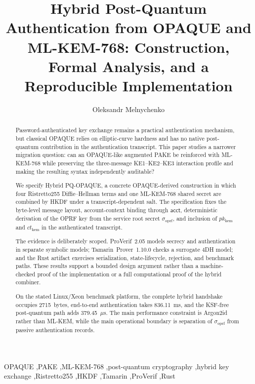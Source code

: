 \documentclass[preprint,12pt]{elsarticle}
\newcommand{\acct}{\mathsf{acct}}
\newcommand{\sigoprf}{\sigma_{\mathrm{oprf}}}
\theoremstyle{remark}
\begin{document}

\begin{frontmatter}

\title{Hybrid Post-Quantum Authentication from OPAQUE and ML-KEM-768: Construction, Formal Analysis, and a Reproducible Implementation}

\author{Oleksandr Melnychenko}

\address{Khmelnytskyi National University, Khmelnytskyi, Ukraine}


\begin{abstract}
Password-authenticated key exchange remains a practical authentication
mechanism, but classical OPAQUE relies on elliptic-curve hardness and has
no native post-quantum contribution in the authentication transcript. This
paper studies a narrower migration question: can an OPAQUE-like augmented
PAKE be reinforced with ML-KEM-768 while preserving the three-message
KE1--KE2--KE3 interaction profile and making the resulting syntax
independently auditable?

We specify Hybrid PQ-OPAQUE, a concrete OPAQUE-derived construction in
which four Ristretto255 Diffie--Hellman terms and one ML-KEM-768 shared
secret are combined by HKDF under a transcript-dependent salt. The
specification fixes the byte-level message layout, account-context binding
through $\acct$, deterministic derivation of the OPRF key from the service
root secret $\sigoprf$, and inclusion of $pk_{\mathrm{kem}}$ and
$ct_{\mathrm{kem}}$ in the authenticated transcript.

The evidence is deliberately scoped. ProVerif~2.05 models secrecy and
authentication in separate symbolic models; Tamarin~Prover~1.10.0 checks a
surrogate 4DH model; and the Rust artifact exercises serialization,
state-lifecycle, rejection, and benchmark paths. These results support a
bounded design argument rather than a machine-checked proof of the
implementation or a full computational proof of the hybrid combiner.

On the stated Linux/Xeon benchmark platform, the complete hybrid handshake
occupies 2715~bytes, end-to-end authentication takes 836.11~ms, and the
KSF-free post-quantum path adds 379.45~$\mu$s. The main performance
constraint is Argon2id rather than ML-KEM, while the main operational
boundary is separation of $\sigoprf$ from passive authentication records.
\end{abstract}

\begin{keyword}
OPAQUE \sep PAKE \sep ML-KEM-768 \sep post-quantum cryptography \sep hybrid key exchange \sep Ristretto255 \sep HKDF \sep Tamarin \sep ProVerif \sep Rust
\end{keyword}

\end{frontmatter}
\end{document}
